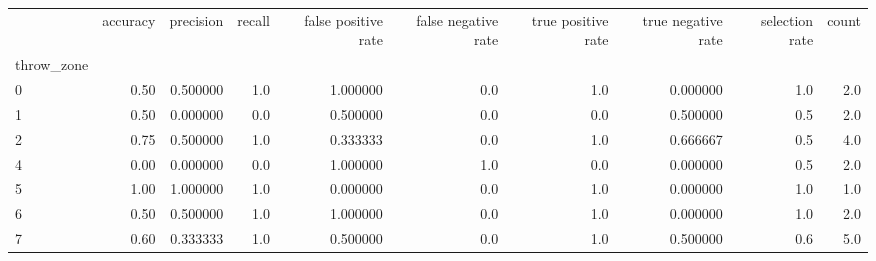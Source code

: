 \begin{tabular}{lrrrrrrrrr}
\toprule
{} &  accuracy &  precision &  recall &  false positive rate &  false negative rate &  true positive rate &  true negative rate &  selection rate &  count \\
throw\_zone &           &            &         &                      &                      &                     &                     &                 &        \\
\midrule
0          &      0.50 &   0.500000 &     1.0 &             1.000000 &                  0.0 &                 1.0 &            0.000000 &             1.0 &    2.0 \\
1          &      0.50 &   0.000000 &     0.0 &             0.500000 &                  0.0 &                 0.0 &            0.500000 &             0.5 &    2.0 \\
2          &      0.75 &   0.500000 &     1.0 &             0.333333 &                  0.0 &                 1.0 &            0.666667 &             0.5 &    4.0 \\
4          &      0.00 &   0.000000 &     0.0 &             1.000000 &                  1.0 &                 0.0 &            0.000000 &             0.5 &    2.0 \\
5          &      1.00 &   1.000000 &     1.0 &             0.000000 &                  0.0 &                 1.0 &            0.000000 &             1.0 &    1.0 \\
6          &      0.50 &   0.500000 &     1.0 &             1.000000 &                  0.0 &                 1.0 &            0.000000 &             1.0 &    2.0 \\
7          &      0.60 &   0.333333 &     1.0 &             0.500000 &                  0.0 &                 1.0 &            0.500000 &             0.6 &    5.0 \\
\bottomrule
\end{tabular}
